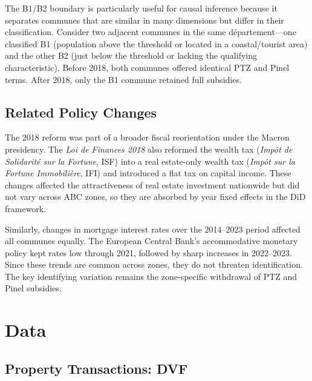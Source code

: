 \documentclass[12pt]{article}
\begin{document}
The B1/B2 boundary is particularly useful for causal inference because it separates communes that are similar in many dimensions but differ in their classification. Consider two adjacent communes in the same département---one classified B1 (population above the threshold or located in a coastal/tourist area) and the other B2 (just below the threshold or lacking the qualifying characteristic). Before 2018, both communes offered identical PTZ and Pinel terms. After 2018, only the B1 commune retained full subsidies.

\subsection{Related Policy Changes}

The 2018 reform was part of a broader fiscal reorientation under the Macron presidency. The \textit{Loi de Finances 2018} also reformed the wealth tax (\textit{Imp\^{o}t de Solidarit\'{e} sur la Fortune}, ISF) into a real estate-only wealth tax (\textit{Imp\^{o}t sur la Fortune Immobili\`{e}re}, IFI) and introduced a flat tax on capital income. These changes affected the attractiveness of real estate investment nationwide but did not vary across ABC zones, so they are absorbed by year fixed effects in the DiD framework.

Similarly, changes in mortgage interest rates over the 2014--2023 period affected all communes equally. The European Central Bank's accommodative monetary policy kept rates low through 2021, followed by sharp increases in 2022--2023. Since these trends are common across zones, they do not threaten identification. The key identifying variation remains the zone-specific withdrawal of PTZ and Pinel subsidies.


\section{Data}

\subsection{Property Transactions: DVF}
\end{document}
